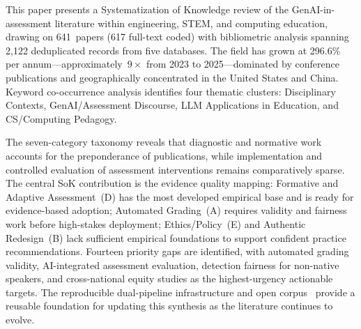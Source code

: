 \documentclass[conference]{IEEEtran}
\begin{document}
This paper presents a Systematization of Knowledge review of the GenAI-in-assessment literature
within engineering, STEM, and computing education, drawing on 641~papers (617 full-text coded)
with bibliometric analysis spanning 2,122 deduplicated records from five databases. The field has
grown at 296.6\% per annum---approximately~$9\times$ from 2023 to 2025---dominated by conference
publications and geographically concentrated in the United States and China. Keyword co-occurrence
analysis identifies four thematic clusters: Disciplinary Contexts, GenAI/Assessment Discourse, LLM
Applications in Education, and CS/Computing Pedagogy.

The seven-category taxonomy reveals that diagnostic and normative work accounts for the preponderance
of publications, while implementation and controlled evaluation of assessment interventions remains
comparatively sparse. The central SoK contribution is the evidence quality mapping: Formative and
Adaptive Assessment~(D) has the most developed empirical base and is ready for evidence-based
adoption; Automated Grading~(A) requires validity and fairness work before high-stakes deployment;
Ethics/Policy~(E) and Authentic Redesign~(B) lack sufficient empirical foundations to support
confident practice recommendations. Fourteen priority gaps are identified, with automated grading
validity, AI-integrated assessment evaluation, detection fairness for non-native speakers, and
cross-national equity studies as the highest-urgency actionable targets. The reproducible dual-pipeline
infrastructure and open corpus~\cite{sok_repo} provide a reusable foundation for updating this
synthesis as the literature continues to evolve.



\end{document}
